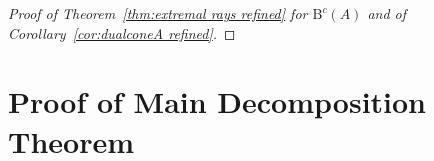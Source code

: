\documentclass[12pt]{amsart}
\theoremstyle{definition}
\theoremstyle{remark}
\newcommand{\cc}{c}
\newcommand{\BBQ}{\mathrm{B}}
\begin{document}
\begin{proof}[Proof of Theorem~\ref{thm:extremal rays refined} for $\BBQ^{\cc}(A)$ and of Corollary~\ref{cor:dualconeA refined}]
\end{proof}




\section{Proof of Main Decomposition Theorem}\label{sec:refined proof}\label{sec:general case}
\end{document}
